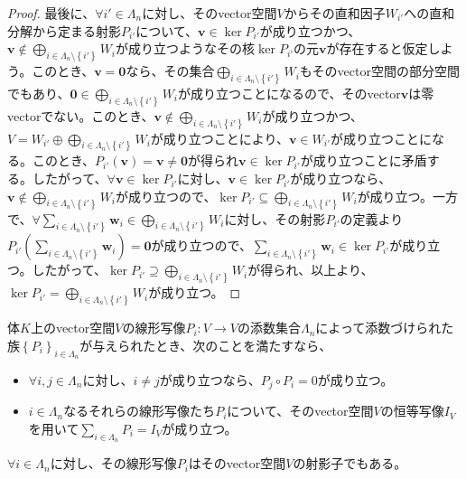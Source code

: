 \documentclass[dvipdfmx]{jsarticle}
\begin{document}
\begin{proof}
最後に、$\forall i' \in \varLambda_{n}$に対し、そのvector空間$V$からその直和因子$W_{i'}$への直和分解から定まる射影$P_{i'}$について、$\mathbf{v} \in \ker P_{i'}$が成り立つかつ、$\mathbf{v} \notin \bigoplus_{i \in \varLambda_{n} \setminus \left\{ i' \right\}} W_{i}$が成り立つようなその核$\ker P_{i'}$の元$\mathbf{v}$が存在すると仮定しよう。このとき、$\mathbf{v} = \mathbf{0}$なら、その集合$\bigoplus_{i \in \varLambda_{n} \setminus \left\{ i' \right\}} W_{i}$もそのvector空間の部分空間でもあり、$\mathbf{0} \in \bigoplus_{i \in \varLambda_{n} \setminus \left\{ i' \right\}} W_{i}$が成り立つことになるので、そのvector$\mathbf{v}$は零vectorでない。このとき、$\mathbf{v} \notin \bigoplus_{i \in \varLambda_{n} \setminus \left\{ i' \right\}} W_{i}$が成り立つかつ、$V = W_{i'} \oplus \bigoplus_{i \in \varLambda_{n} \setminus \left\{ i' \right\}} W_{i}$が成り立つことにより、$\mathbf{v} \in W_{i'}$が成り立つことになる。このとき、$P_{i'}\left( \mathbf{v} \right) = \mathbf{v} \neq \mathbf{0}$が得られ$\mathbf{v} \in \ker P_{i'}$が成り立つことに矛盾する。したがって、$\forall\mathbf{v} \in \ker P_{i'}$に対し、$\mathbf{v} \in \ker P_{i'}$が成り立つなら、$\mathbf{v} \notin \bigoplus_{i \in \varLambda_{n} \setminus \left\{ i' \right\}} W_{i}$が成り立つので、$\ker P_{i'} \subseteq \bigoplus_{i \in \varLambda_{n} \setminus \left\{ i' \right\}} W_{i}$が成り立つ。一方で、$\forall\sum_{i \in \varLambda_{n} \setminus \left\{ i' \right\}} \mathbf{w}_{i} \in \bigoplus_{i \in \varLambda_{n} \setminus \left\{ i' \right\}} W_{i}$に対し、その射影$P_{i'}$の定義より$P_{i'}\left( \sum_{i \in \varLambda_{n} \setminus \left\{ i' \right\}} \mathbf{w}_{i} \right) = \mathbf{0}$が成り立つので、$\sum_{i \in \varLambda_{n} \setminus \left\{ i' \right\}} \mathbf{w}_{i} \in \ker P_{i'}$が成り立つ。したがって、$\ker P_{i'} \supseteq \bigoplus_{i \in \varLambda_{n} \setminus \left\{ i' \right\}} W_{i}$が得られ、以上より、$\ker P_{i'} = \bigoplus_{i \in \varLambda_{n} \setminus \left\{ i' \right\}} W_{i}$が成り立つ。
\end{proof}
\begin{thm}\label{2.2.1.9}
体$K$上のvector空間$V$の線形写像$P_{i}:V \rightarrow V$の添数集合$\varLambda_{n}$によって添数づけられた族$\left\{ P_{i} \right\}_{i \in \varLambda_{n}}$が与えられたとき、次のことを満たすなら、
\begin{itemize}
\item
  $\forall i,j \in \varLambda_{n}$に対し、$i \neq j$が成り立つなら、$P_{j} \circ P_{i} = 0$が成り立つ。
\item
  $i \in \varLambda_{n}$なるそれらの線形写像たち$P_{i}$について、そのvector空間$V$の恒等写像$I_{V}$を用いて$\sum_{i \in \varLambda_{n}} P_{i} = I_{V}$が成り立つ。
\end{itemize}
$\forall i \in \varLambda_{n}$に対し、その線形写像$P_{i}$はそのvector空間$V$の射影子でもある。
\end{thm}
\end{document}
